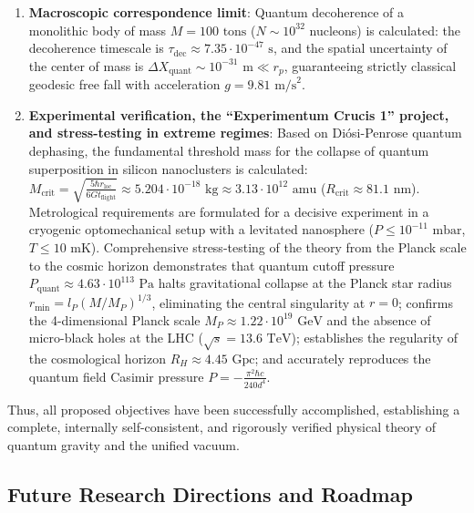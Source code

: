 \begin{enumerate}
\item \textbf{Macroscopic correspondence limit}: Quantum decoherence of a monolithic body of mass $M = 100\text{ tons}$ ($N \sim 10^{32}$ nucleons) is calculated: the decoherence timescale is $\tau_{\text{dec}} \approx 7.35 \cdot 10^{-47}\text{ s}$, and the spatial uncertainty of the center of mass is $\Delta X_{\text{quant}} \sim 10^{-31}\text{ m} \ll r_p$, guaranteeing strictly classical geodesic free fall with acceleration $g = 9.81\text{ m/s}^2$.

\item \textbf{Experimental verification, the ``Experimentum Crucis 1'' project, and stress-testing in extreme regimes}: Based on Diósi-Penrose quantum dephasing, the fundamental threshold mass for the collapse of quantum superposition in silicon nanoclusters is calculated: $M_{\text{crit}} = \sqrt{\frac{5\hbar r_{\text{loc}}}{6 G t_{\text{flight}}}} \approx 5.204 \cdot 10^{-18}\text{ kg} \approx 3.13 \cdot 10^{12}\text{ amu}$ ($R_{\text{crit}} \approx 81.1\text{ nm}$). Metrological requirements are formulated for a decisive experiment in a cryogenic optomechanical setup with a levitated nanosphere ($P \le 10^{-11}\text{ mbar}$, $T \le 10\text{ mK}$). Comprehensive stress-testing of the theory from the Planck scale to the cosmic horizon demonstrates that quantum cutoff pressure $P_{\text{quant}} \approx 4.63 \cdot 10^{113}\text{ Pa}$ halts gravitational collapse at the Planck star radius $r_{\min} = l_P (M/M_P)^{1/3}$, eliminating the central singularity at $r=0$; confirms the 4-dimensional Planck scale $M_P \approx 1.22 \cdot 10^{19}\text{ GeV}$ and the absence of micro-black holes at the LHC ($\sqrt{s} = 13.6\text{ TeV}$); establishes the regularity of the cosmological horizon $R_H \approx 4.45\text{ Gpc}$; and accurately reproduces the quantum field Casimir pressure $P = - \frac{\pi^2 \hbar c}{240 d^4}$.
\end{enumerate}

Thus, all proposed objectives have been successfully accomplished, establishing a complete, internally self-consistent, and rigorously verified physical theory of quantum gravity and the unified vacuum.

\subsection{Future Research Directions and Roadmap}\label{subsec:roadmap}

